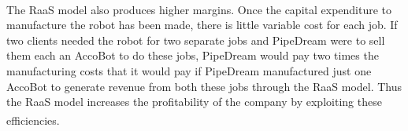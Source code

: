 \documentclass[11pt]{article}		%
\newcommand{\supercite}[1]{\textsuperscript{\cite{#1}}}		%
\begin{document}
\\ \hspace*{3ex}
The RaaS model also produces higher margins. Once the capital expenditure to manufacture the robot has been made, there is little variable cost for each job. If two clients needed the robot for two separate jobs and PipeDream were to sell them each an AccoBot to do these jobs, PipeDream would pay two times the manufacturing costs that it would pay if PipeDream manufactured just one AccoBot to generate revenue from both these jobs through the RaaS model. Thus the RaaS model increases the profitability of the company by exploiting these efficiencies.\supercite{monetise_RaaS}
\\
            
            
\end{document}
